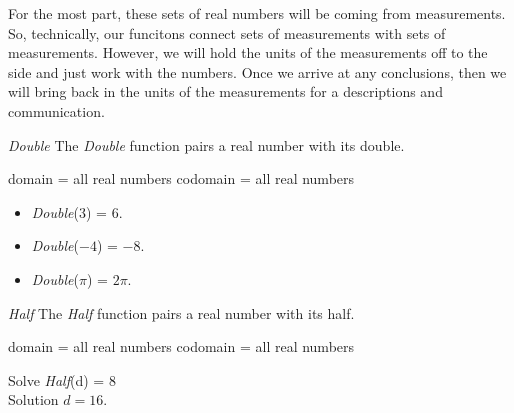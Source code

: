 \documentclass{ximera}
\begin{document}
For the most part, these sets of real numbers will be coming from measurements.  So, technically, our funcitons connect sets of measurements with sets of measurements. However, we will hold the units of the measurements off to the side and just work with the numbers.  Once we arrive at any conclusions, then we will bring back in the units of the measurements for a descriptions and communication.


\begin{example} \textit{Double}
The \textit{Double} function pairs a real number with its double.

domain = all real numbers  
codomain = all real numbers


\begin{itemize}
\item \textit{Double}($3$) = $6$.
\item \textit{Double}($-4$) = $-8$.
\item \textit{Double}($\pi$) = $2 \pi$.
\end{itemize}

\end{example} 



\begin{example} \textit{Half}
The \textit{Half} function pairs a real number with its half.

domain = all real numbers  
codomain = all real numbers


Solve \textit{Half}(d) = $8$ \\

Solution $d = 16$.

\end{example} 
\end{document}
